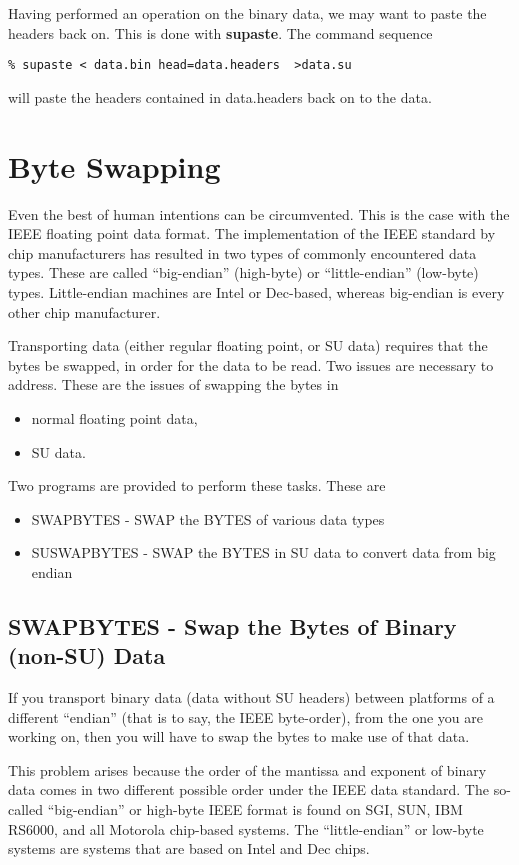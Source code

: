 {{{Having performed an operation on the binary data, we may want to
paste the headers back on. This is done with {\bf supaste}.
The command sequence
{\small\begin{verbatim}
% supaste < data.bin head=data.headers  >data.su
\end{verbatim}}\noindent
will paste the headers contained in data.headers back on to the
data.

\section{Byte Swapping}
Even the best of human intentions can be circumvented. This is
the case with the IEEE floating point data format.
The implementation of the IEEE standard by chip manufacturers
has resulted in two types of commonly encountered data types.
These are called ``big-endian'' (high-byte) or ``little-endian''
(low-byte) types. Little-endian machines are Intel or Dec-based,
whereas big-endian is every other chip manufacturer.

Transporting data (either regular floating point, or SU data)
requires that the bytes be swapped, in order for the data to
be read. Two issues are necessary to address. These are
the issues of swapping the bytes in
\begin{itemize}
\item normal floating point data,
\item SU data.
\end{itemize}

Two programs are provided to perform these tasks. These are
\begin{itemize}
\item SWAPBYTES - SWAP the BYTES of various  data types
\item SUSWAPBYTES - SWAP the BYTES in SU data to convert data from big endian
\end{itemize}

\subsection{SWAPBYTES - Swap the Bytes of Binary (non-SU) Data}

If you transport binary data (data without SU headers) between 
platforms of a different ``endian'' (that is to say, the IEEE byte-order),
from the one you are working on, then you will have to swap the
bytes to make use of that data.

This problem arises because the order of the mantissa and exponent
of binary data comes in two different possible order
under the IEEE data standard.
The so-called ``big-endian'' or high-byte IEEE format is found on SGI,
SUN, IBM RS6000, and all Motorola chip-based systems. 
The ``little-endian'' or low-byte systems are systems that are based
on Intel and Dec chips.

}}}
